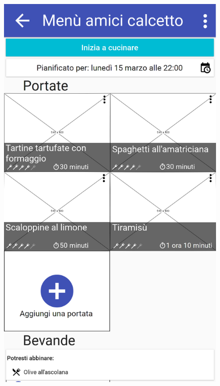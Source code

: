 \begin{figure}[H]
\begin{minipage}{.49\textwidth}
		\includegraphics[width=\textwidth]{img/wireframe/men_amici_calcetto_menu_contestuale_piatto.png}
	\end{minipage}
\end{figure}

